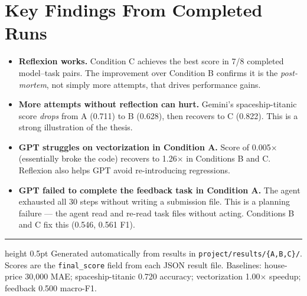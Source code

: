 \documentclass[11pt,a4paper]{article}
\begin{document}
\section*{Key Findings From Completed Runs}

\begin{itemize}[leftmargin=1.5em, itemsep=4pt]
  \item \textbf{Reflexion works.} Condition C achieves the best score in 7/8 completed
        model--task pairs. The improvement over Condition B confirms it is the
        \emph{post-mortem}, not simply more attempts, that drives performance gains.

  \item \textbf{More attempts without reflection can hurt.}
        Gemini's spaceship-titanic score \emph{drops} from A (0.711) to B (0.628),
        then recovers to C (0.822). This is a strong illustration of the thesis.

  \item \textbf{GPT struggles on vectorization in Condition A.}
        Score of 0.005$\times$ (essentially broke the code) recovers to 1.26$\times$ in
        Conditions B and C. Reflexion also helps GPT avoid re-introducing regressions.

  \item \textbf{GPT failed to complete the feedback task in Condition A.}
        The agent exhausted all 30 steps without writing a submission file. This is a
        planning failure --- the agent read and re-read task files without acting.
        Conditions B and C fix this (0.546, 0.561 F1).
\end{itemize}

\vspace{1em}
\hrule height 0.5pt
\vspace{0.5em}
{\small\color{gray}
Generated automatically from results in \texttt{project/results/\{A,B,C\}/}.
Scores are the \texttt{final\_score} field from each JSON result file.
Baselines: house-price 30{,}000 MAE; spaceship-titanic 0.720 accuracy;
vectorization 1.00$\times$ speedup; feedback 0.500 macro-F1.
}
\end{document}
